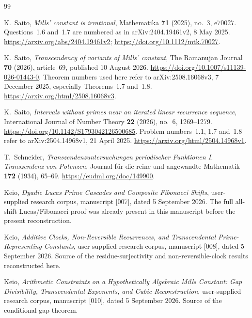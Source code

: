 \documentclass[11pt,a4paper]{article}
\numberwithin{equation}{section}
\theoremstyle{definition}
\theoremstyle{remark}
\begin{document}
\clearpage
{}
{}
\begin{thebibliography}{99}



K.~Saito, \emph{Mills' constant is irrational},
Mathematika \textbf{71} (2025), no.~3, e70027.
Questions~1.6 and~1.7 are numbered as in arXiv:2404.19461v2,
8 May 2025.
\url{https://arxiv.org/abs/2404.19461v2};
\url{https://doi.org/10.1112/mtk.70027}.

K.~Saito, \emph{Transcendency of variants of Mills' constant},
The Ramanujan Journal \textbf{70} (2026), article~69,
published 10 August 2026.
\url{https://doi.org/10.1007/s11139-026-01443-0}.
Theorem numbers used here refer to arXiv:2508.16068v3,
7 December 2025, especially Theorems~1.7 and~1.8.
\url{https://arxiv.org/html/2508.16068v3}.

K.~Saito, \emph{Intervals without primes near an iterated
linear recurrence sequence}, International Journal of
Number Theory \textbf{22} (2026), no.~6, 1269--1279.
\url{https://doi.org/10.1142/S1793042126500685}.
Problem numbers~1.1, 1.7 and~1.8 refer to
arXiv:2504.14968v1, 21 April 2025.
\url{https://arxiv.org/html/2504.14968v1}.

T.~Schneider, \emph{Transzendenzuntersuchungen periodischer
Funktionen I. Transzendenz von Potenzen}, Journal f\"ur die
reine und angewandte Mathematik \textbf{172} (1934), 65--69.
\url{https://eudml.org/doc/149900}.

Keio, \emph{Dyadic Lucas Prime Cascades and Composite
Fibonacci Shifts}, user-supplied research corpus,
manuscript [007], dated 5 September 2026.
The full all-shift Lucas/Fibonacci proof was already present
in this manuscript before the present reconstruction.

Keio, \emph{Additive Clocks, Non-Reversible Recurrences, and
Transcendental Prime-Representing Constants}, user-supplied
research corpus, manuscript [008], dated 5 September 2026.
Source of the residue-surjectivity and non-reversible-clock
results reconstructed here.

Keio, \emph{Arithmetic Constraints on a Hypothetically
Algebraic Mills Constant: Gap Divisibility, Transcendental
Exponents, and Cubic Reconstruction}, user-supplied research
corpus, manuscript [010], dated 5 September 2026.
Source of the conditional gap theorem.


\end{thebibliography}
\end{document}
